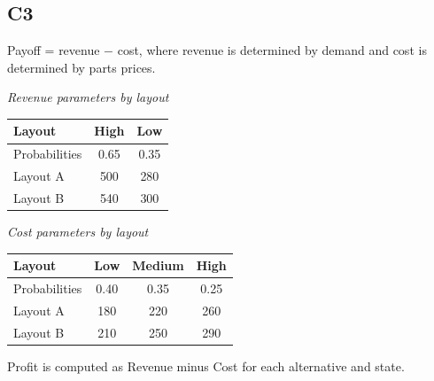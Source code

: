 \begin{ExamProblems}
		\subsection*{C3}
		Payoff = revenue $-$ cost, where revenue is determined by demand and cost is determined by parts prices.
		\begin{center}
			\begin{minipage}[t]{0.48\linewidth}
				\textit{Revenue parameters by layout}
				\begin{center}
					\begin{tabular}{l c c}
						\toprule
						Layout & High & Low \\
						\midrule
						Probabilities & 0.65 & 0.35 \\
						Layout A & 500 & 280 \\
						Layout B & 540 & 300 \\
						\bottomrule
					\end{tabular}
				\end{center}
			\end{minipage}
			\hfill
			\begin{minipage}[t]{0.48\linewidth}
				\textit{Cost parameters by layout}
				\begin{center}
					\begin{tabular}{l c c c}
						\toprule
						Layout & Low & Medium & High \\
						\midrule
						Probabilities & 0.40 & 0.35 & 0.25 \\
						Layout A & 180 & 220 & 260 \\
						Layout B & 210 & 250 & 290 \\
						\bottomrule
					\end{tabular}
				\end{center}
			\end{minipage}
		\end{center}
		Profit is computed as Revenue minus Cost for each alternative and state.
		

\end{ExamProblems}
